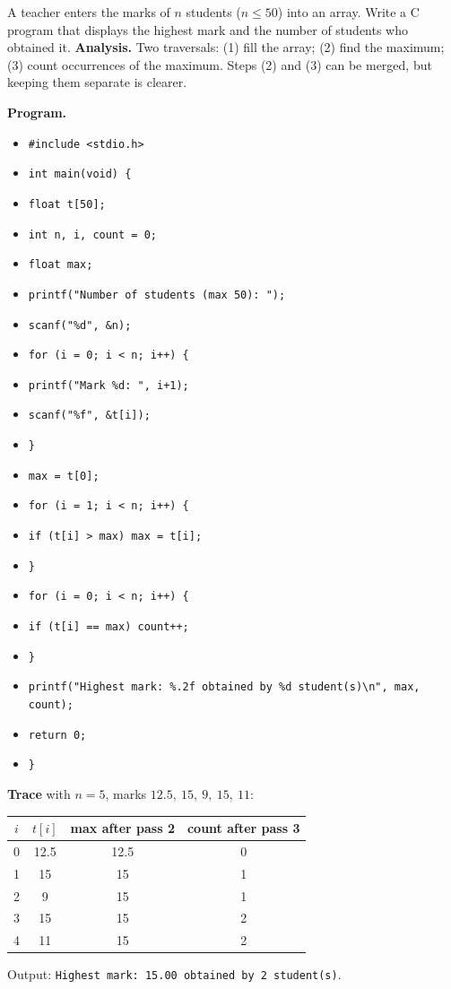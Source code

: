 \documentclass[11pt]{article}
\begin{document}
\begin{exoresolu}
A teacher enters the marks of $n$ students ($n \le 50$) into an array. Write a C program that displays the highest mark and the number of students who obtained it.
\tcblower
\textbf{Analysis.} Two traversals: (1) fill the array; (2) find the maximum; (3) count occurrences of the maximum. Steps (2) and (3) can be merged, but keeping them separate is clearer.

\textbf{Program.}
\begin{itemize}
\item \texttt{\#include <stdio.h>}
\item \texttt{int main(void) \{}
\item \texttt{\quad float t[50];}
\item \texttt{\quad int n, i, count = 0;}
\item \texttt{\quad float max;}
\item \texttt{\quad printf("Number of students (max 50): ");}
\item \texttt{\quad scanf("\%d", \&n);}
\item \texttt{\quad for (i = 0; i < n; i++) \{}
\item \texttt{\quad\quad printf("Mark \%d: ", i+1);}
\item \texttt{\quad\quad scanf("\%f", \&t[i]);}
\item \texttt{\quad \}}
\item \texttt{\quad max = t[0];}
\item \texttt{\quad for (i = 1; i < n; i++) \{}
\item \texttt{\quad\quad if (t[i] > max) max = t[i];}
\item \texttt{\quad \}}
\item \texttt{\quad for (i = 0; i < n; i++) \{}
\item \texttt{\quad\quad if (t[i] == max) count++;}
\item \texttt{\quad \}}
\item \texttt{\quad printf("Highest mark: \%.2f obtained by \%d student(s)\textbackslash n", max, count);}
\item \texttt{\quad return 0;}
\item \texttt{\}}
\end{itemize}

\textbf{Trace} with $n = 5$, marks $12.5,\ 15,\ 9,\ 15,\ 11$:
\begin{center}
\begin{tabular}{|c|c|c|c|}
\hline
\rowcolor{popblueL} $i$ & $t[i]$ & max after pass 2 & count after pass 3 \\ \hline
0 & 12.5 & 12.5 & 0 \\ \hline
1 & 15 & 15 & 1 \\ \hline
2 & 9 & 15 & 1 \\ \hline
3 & 15 & 15 & 2 \\ \hline
4 & 11 & 15 & 2 \\ \hline
\end{tabular}
\end{center}
Output: \texttt{Highest mark: 15.00 obtained by 2 student(s)}.


\end{exoresolu}
\end{document}
